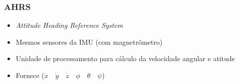 \documentclass{beamer}
\begin{document}
\begin{frame}	
	
	\frametitle{AHRS}	
		
	\begin{itemize}
		
		\item \textit{Attitude Heading Reference System}
		
		\item Mesmos sensores da IMU (com magnetrômetro)
		
		\item Unidade de processamento para cálculo da velocidade angular e atitude
		
		\item Fornece (${ \dot { x }  }\quad { \dot { y }  }\quad { \dot { z }  }\quad { \phi  }\quad { \theta  }\quad { \psi  }$)
	 
	\end{itemize}
\end{frame}	
\end{document}
